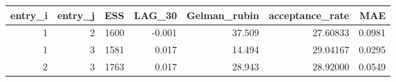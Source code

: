 \begin{longtable}{rrrrrrr}
\toprule
entry\_i & entry\_j & ESS & LAG\_30 & Gelman\_rubin & acceptance\_rate & MAE \\ 
\midrule
1 & 2 & 1600 & -0.001 & 37.509 & 27.60833 & 0.0981 \\ 
1 & 3 & 1581 & 0.017 & 14.494 & 29.04167 & 0.0295 \\ 
2 & 3 & 1763 & 0.017 & 28.943 & 28.92000 & 0.0549 \\ 
\bottomrule
\end{longtable}


